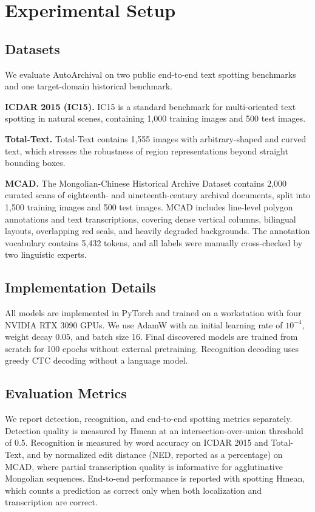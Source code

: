\documentclass[a4paper,fleqn,longmktitle]{cas-sc}
\begin{document}
\section{Experimental Setup}

\subsection{Datasets}

We evaluate AutoArchival on two public end-to-end text spotting benchmarks and one target-domain historical benchmark.

\textbf{ICDAR 2015 (IC15).} IC15 is a standard benchmark for multi-oriented text spotting in natural scenes, containing 1,000 training images and 500 test images.

\textbf{Total-Text.} Total-Text contains 1,555 images with arbitrary-shaped and curved text, which stresses the robustness of region representations beyond straight bounding boxes.

\textbf{MCAD.} The Mongolian-Chinese Historical Archive Dataset contains 2,000 curated scans of eighteenth- and nineteenth-century archival documents, split into 1,500 training images and 500 test images. MCAD includes line-level polygon annotations and text transcriptions, covering dense vertical columns, bilingual layouts, overlapping red seals, and heavily degraded backgrounds. The annotation vocabulary contains 5,432 tokens, and all labels were manually cross-checked by two linguistic experts.

\subsection{Implementation Details}

All models are implemented in PyTorch and trained on a workstation with four NVIDIA RTX 3090 GPUs. We use AdamW with an initial learning rate of $10^{-4}$, weight decay $0.05$, and batch size 16. Final discovered models are trained from scratch for 100 epochs without external pretraining. Recognition decoding uses greedy CTC decoding without a language model.

\subsection{Evaluation Metrics}

We report detection, recognition, and end-to-end spotting metrics separately. Detection quality is measured by Hmean at an intersection-over-union threshold of 0.5. Recognition is measured by word accuracy on ICDAR 2015 and Total-Text, and by normalized edit distance (NED, reported as a percentage) on MCAD, where partial transcription quality is informative for agglutinative Mongolian sequences. End-to-end performance is reported with spotting Hmean, which counts a prediction as correct only when both localization and transcription are correct.
\end{document}
